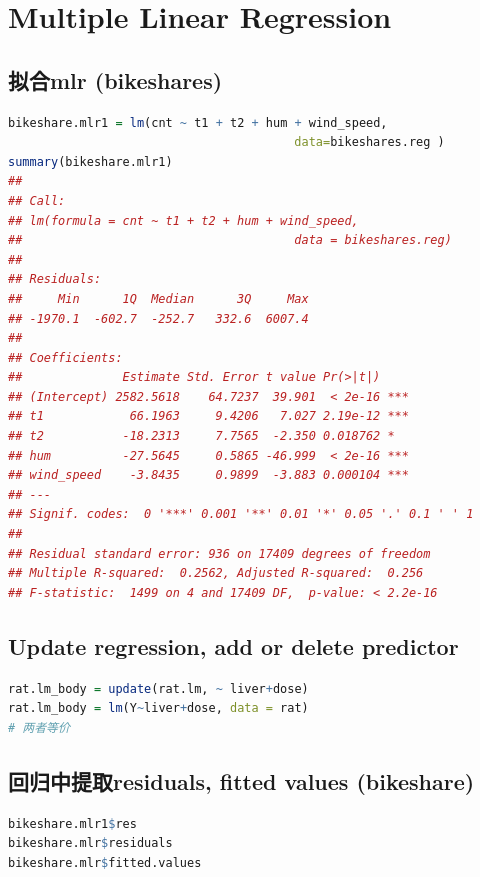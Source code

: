 \documentclass[11pt,a4paper]{article}
\begin{document}
\section{Multiple Linear Regression}
\subsection{拟合mlr (bikeshares)}
\begin{lstlisting}[language=R]
bikeshare.mlr1 = lm(cnt ~ t1 + t2 + hum + wind_speed,
                                        data=bikeshares.reg )
summary(bikeshare.mlr1)
## 
## Call:
## lm(formula = cnt ~ t1 + t2 + hum + wind_speed,
##                                      data = bikeshares.reg)
## 
## Residuals:
##     Min      1Q  Median      3Q     Max 
## -1970.1  -602.7  -252.7   332.6  6007.4 
## 
## Coefficients:
##              Estimate Std. Error t value Pr(>|t|)    
## (Intercept) 2582.5618    64.7237  39.901  < 2e-16 ***
## t1            66.1963     9.4206   7.027 2.19e-12 ***
## t2           -18.2313     7.7565  -2.350 0.018762 *  
## hum          -27.5645     0.5865 -46.999  < 2e-16 ***
## wind_speed    -3.8435     0.9899  -3.883 0.000104 ***
## ---
## Signif. codes:  0 '***' 0.001 '**' 0.01 '*' 0.05 '.' 0.1 ' ' 1
## 
## Residual standard error: 936 on 17409 degrees of freedom
## Multiple R-squared:  0.2562, Adjusted R-squared:  0.256 
## F-statistic:  1499 on 4 and 17409 DF,  p-value: < 2.2e-16
\end{lstlisting}

\subsection{Update regression, add or delete predictor}
\begin{lstlisting}[language=R]
rat.lm_body = update(rat.lm, ~ liver+dose)
rat.lm_body = lm(Y~liver+dose, data = rat)
# 两者等价
\end{lstlisting}










\subsection{回归中提取residuals, fitted values (bikeshare)}
\begin{lstlisting}[language=R]
bikeshare.mlr1$res
bikeshare.mlr$residuals
bikeshare.mlr$fitted.values
\end{lstlisting}
\end{document}
